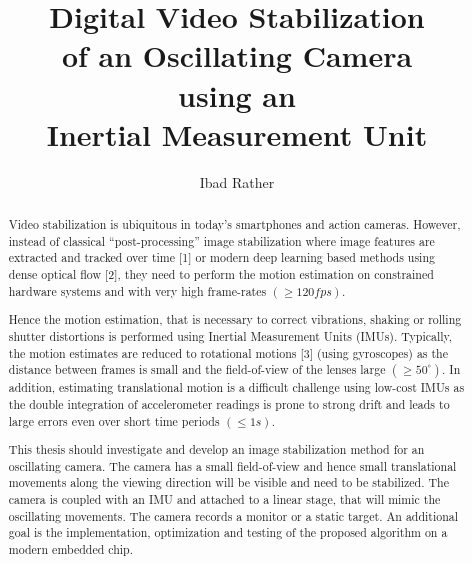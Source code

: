 \documentclass[
thesis  %
]{csthes}
\title{Digital Video Stabilization \\ of an Oscillating Camera \\
using an \\ Inertial Measurement Unit}
\subtitle{}%
\author{Ibad Rather \matr{1532894}}
\begin{document}
\maketitle
\begin{abstract}
Video stabilization is ubiquitous in today's smartphones and action cameras. However, instead of classical “post-processing” image stabilization where image features are extracted and tracked over time [1] or modern deep learning based methods using dense optical flow [2], they need to perform the motion estimation on constrained hardware systems and with very high  frame-rates $(\geq 120 fps).$ 

Hence the motion estimation, that is necessary to correct vibrations, shaking or rolling shutter distortions is performed using Inertial Measurement Units (IMUs). Typically, the motion estimates are reduced to rotational motions [3] (using gyroscopes) as the distance between frames is small and the field-of-view of the lenses large $(\geq 50^\circ)$. In addition, estimating translational motion is a difficult challenge using low-cost IMUs as the double integration of accelerometer readings is prone to strong drift and leads to large errors even over short time periods $(\leq 1s)$. 

This thesis should investigate and develop an image stabilization method for an oscillating camera. The camera has a small field-of-view and hence small translational movements along the viewing direction will be visible and need to be stabilized. The camera is coupled with an IMU and attached to a linear stage, that will mimic the oscillating movements. The camera records a monitor or a static target. An additional goal is the implementation, optimization and testing of the proposed algorithm on a modern embedded chip.

\end{abstract}
\tableofcontents%

\listoftables%
\listoffigures%

\mainmatter









\end{document}
